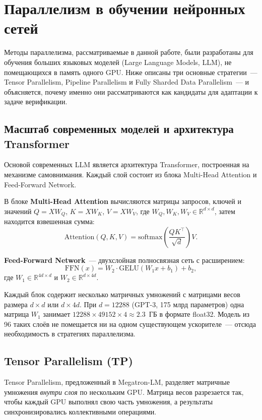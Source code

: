 \section{Параллелизм в обучении нейронных сетей}

Методы параллелизма, рассматриваемые в данной работе, были разработаны
для обучения больших языковых моделей (Large Language Models, LLM),
не помещающихся в память одного GPU.
Ниже описаны три основные стратегии~--- Tensor Parallelism, Pipeline
Parallelism и Fully Sharded Data Parallelism~--- и объясняется,
почему именно они рассматриваются как кандидаты для адаптации к
задаче верификации.

\subsection{Масштаб современных моделей и архитектура Transformer}

Основой современных LLM является архитектура Transformer\cite{Vaswani2017Attention},
построенная на механизме самовнимания.
Каждый слой состоит из блока Multi-Head Attention и Feed-Forward Network.

В блоке \textbf{Multi-Head Attention} вычисляются матрицы запросов,
ключей и значений $Q = XW_Q$, $K = XW_K$, $V = XW_V$,
где $W_Q, W_K, W_V \in \mathbb{R}^{d \times d}$, затем находится
взвешенная сумма:
$$\mathrm{Attention}(Q, K, V) = \mathrm{softmax}\!\left(\frac{QK^\top}{\sqrt{d}}\right)V.$$

\textbf{Feed-Forward Network}~--- двухслойная полносвязная сеть с расширением:
$$\mathrm{FFN}(x) = W_2 \cdot \mathrm{GELU}(W_1 x + b_1) + b_2,$$
где $W_1 \in \mathbb{R}^{4d \times d}$ и $W_2 \in \mathbb{R}^{d \times 4d}$.

Каждый блок содержит несколько матричных умножений с матрицами весов
размера $d \times d$ или $d \times 4d$.
При $d = 12288$ (GPT-3, 175 млрд параметров\cite{GPT3Brown2020}) одна
матрица $W_1$ занимает $12288 \times 49152 \times 4 \approx 2.3$~ГБ
в формате float32.
Модель из 96 таких слоёв не помещается ни на одном существующем
ускорителе~--- отсюда необходимость в стратегиях параллелизма.

\subsection{Tensor Parallelism (TP)}

Tensor Parallelism, предложенный в Megatron-LM\cite{MegatronLM2020},
разделяет матричные умножения \textit{внутри слоя} по нескольким GPU.
Матрица весов разрезается так, чтобы каждый GPU выполнял свою часть
умножения, а результаты синхронизировались коллективными операциями.

